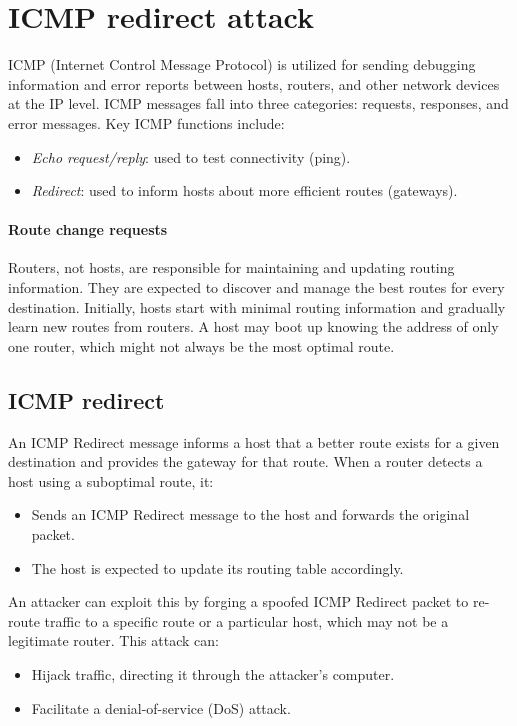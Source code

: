 \section{ICMP redirect attack}

ICMP (Internet Control Message Protocol) is utilized for sending debugging information and error reports between hosts, routers, and other network devices at the IP level. 
ICMP messages fall into three categories: requests, responses, and error messages.
Key ICMP functions include:
\begin{itemize}
    \item \textit{Echo request/reply}: used to test connectivity (ping).
    \item \textit{Redirect}: used to inform hosts about more efficient routes (gateways).
\end{itemize}

\paragraph*{Route change requests}
Routers, not hosts, are responsible for maintaining and updating routing information. 
They are expected to discover and manage the best routes for every destination. 
Initially, hosts start with minimal routing information and gradually learn new routes from routers.
A host may boot up knowing the address of only one router, which might not always be the most optimal route.

\subsection{ICMP redirect}
An ICMP Redirect message informs a host that a better route exists for a given destination and provides the gateway for that route.
When a router detects a host using a suboptimal route, it:
\begin{itemize}
    \item Sends an ICMP Redirect message to the host and forwards the original packet.
    \item The host is expected to update its routing table accordingly.
\end{itemize}
An attacker can exploit this by forging a spoofed ICMP Redirect packet to re-route traffic to a specific route or a particular host, which may not be a legitimate router. This attack can:
\begin{itemize}
    \item Hijack traffic, directing it through the attacker's computer.
    \item Facilitate a denial-of-service (DoS) attack.
\end{itemize}

